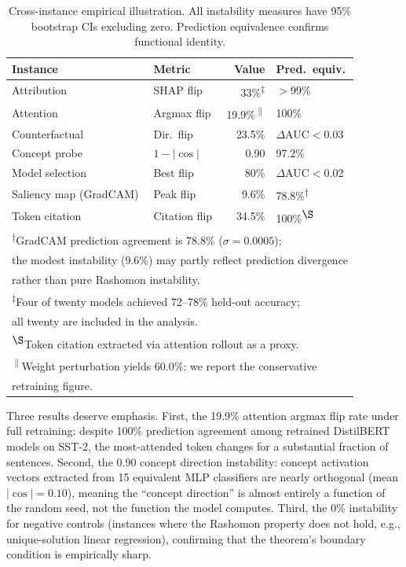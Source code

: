 \documentclass[twocolumn]{article}
\begin{document}
\begin{table}[t]
\centering
\caption{Cross-instance empirical illustration. All instability measures have
95\% bootstrap CIs excluding zero. Prediction equivalence confirms
functional identity.}
\label{tab:cross-instance}
\small
\begin{tabular}{@{}llrl@{}}
\toprule
Instance & Metric & Value & Pred.\ equiv. \\
\midrule
Attribution & SHAP flip & 33\%\textsuperscript{$\ddagger$} & $>$99\% \\
Attention & Argmax flip & 19.9\%\textsuperscript{$\|$} & 100\% \\
Counterfactual & Dir.\ flip & 23.5\% & $\Delta$AUC$<$0.03 \\
Concept probe & $1{-}|\cos|$ & 0.90 & 97.2\% \\
Model selection & Best flip & 80\% & $\Delta$AUC$<$0.02 \\
Saliency map (GradCAM) & Peak flip & 9.6\% & 78.8\%\textsuperscript{$\dagger$} \\
Token citation & Citation flip & 34.5\% & 100\%\textsuperscript{$\S$} \\
\bottomrule
\multicolumn{4}{l}{\textsuperscript{$\dagger$}GradCAM prediction agreement is 78.8\% ($\sigma = 0.0005$);} \\
\multicolumn{4}{l}{\quad the modest instability (9.6\%) may partly reflect prediction divergence} \\
\multicolumn{4}{l}{\quad rather than pure Rashomon instability.} \\
\multicolumn{4}{l}{\textsuperscript{$\ddagger$}Four of twenty models achieved 72--78\% held-out accuracy;} \\
\multicolumn{4}{l}{\quad all twenty are included in the analysis.} \\
\multicolumn{4}{l}{\textsuperscript{$\S$}Token citation extracted via attention rollout as a proxy.} \\
\multicolumn{4}{l}{\textsuperscript{$\|$}Weight perturbation yields 60.0\%; we report the conservative} \\
\multicolumn{4}{l}{\quad retraining figure.} \\
\end{tabular}
\end{table}

Three results deserve emphasis. First, the 19.9\% attention argmax flip
rate under full retraining: despite 100\% prediction agreement among
retrained DistilBERT models on SST-2, the most-attended token changes
for a substantial fraction of sentences. Second, the
0.90 concept direction instability: concept activation vectors extracted
from 15 equivalent MLP classifiers are nearly orthogonal (mean
$|\cos| = 0.10$), meaning the ``concept direction'' is almost entirely a
function of the random seed, not the function the model computes. Third,
the 0\% instability for negative controls (instances where the Rashomon
property does not hold, e.g., unique-solution linear regression),
confirming that the theorem's boundary condition is empirically sharp.
\end{document}
